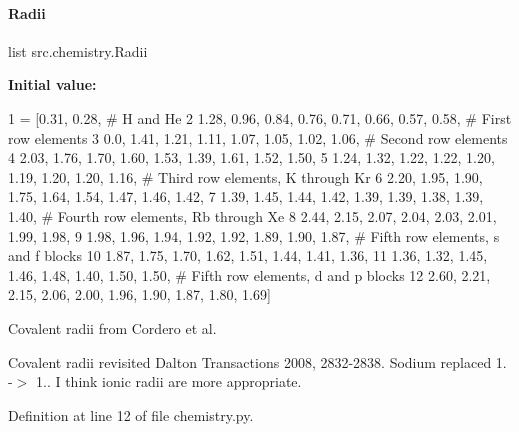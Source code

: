 \paragraph{\texorpdfstring{Radii}{Radii}}
{\footnotesize\ttfamily list src.\+chemistry.\+Radii}

{\bfseries Initial value\+:}
\begin{DoxyCode}
1 =  [0.31, 0.28, \textcolor{comment}{# H and He}
2          1.28, 0.96, 0.84, 0.76, 0.71, 0.66, 0.57, 0.58, \textcolor{comment}{# First row elements}
3          0.0, 1.41, 1.21, 1.11, 1.07, 1.05, 1.02, 1.06, \textcolor{comment}{# Second row elements}
4          2.03, 1.76, 1.70, 1.60, 1.53, 1.39, 1.61, 1.52, 1.50, 
5          1.24, 1.32, 1.22, 1.22, 1.20, 1.19, 1.20, 1.20, 1.16, \textcolor{comment}{# Third row elements, K through Kr}
6          2.20, 1.95, 1.90, 1.75, 1.64, 1.54, 1.47, 1.46, 1.42, 
7          1.39, 1.45, 1.44, 1.42, 1.39, 1.39, 1.38, 1.39, 1.40, \textcolor{comment}{# Fourth row elements, Rb through Xe}
8          2.44, 2.15, 2.07, 2.04, 2.03, 2.01, 1.99, 1.98, 
9          1.98, 1.96, 1.94, 1.92, 1.92, 1.89, 1.90, 1.87, \textcolor{comment}{# Fifth row elements, s and f blocks}
10          1.87, 1.75, 1.70, 1.62, 1.51, 1.44, 1.41, 1.36, 
11          1.36, 1.32, 1.45, 1.46, 1.48, 1.40, 1.50, 1.50, \textcolor{comment}{# Fifth row elements, d and p blocks}
12          2.60, 2.21, 2.15, 2.06, 2.00, 1.96, 1.90, 1.87, 1.80, 1.69]
\end{DoxyCode}


Covalent radii from Cordero et al. 

\textquotesingle{}Covalent radii revisited\textquotesingle{} Dalton Transactions 2008, 2832-\/2838. Sodium replaced 1. -\/$>$ 1.. I think ionic radii are more appropriate. 

Definition at line 12 of file chemistry.\+py.

